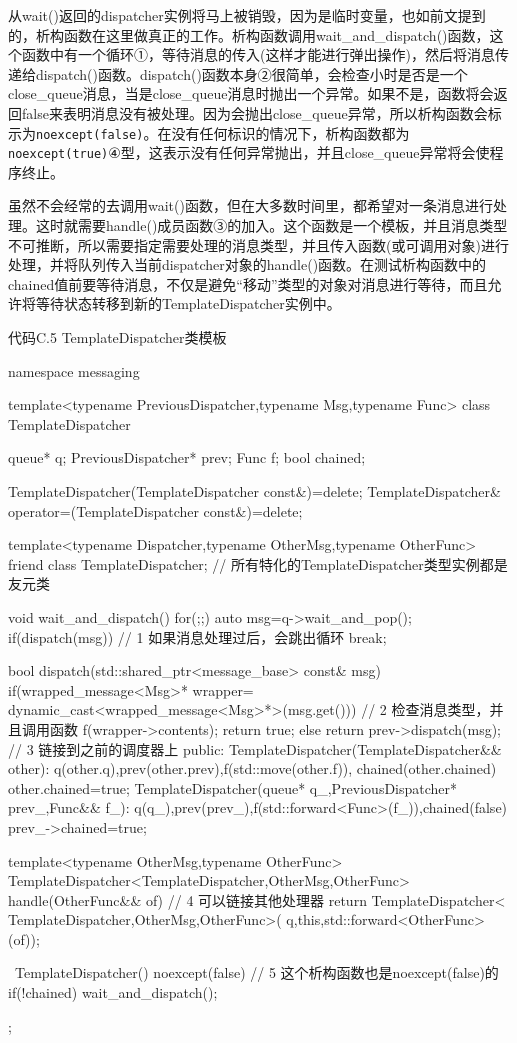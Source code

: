 从wait()返回的dispatcher实例将马上被销毁，因为是临时变量，也如前文提到的，析构函数在这里做真正的工作。析构函数调用wait\_and\_dispatch()函数，这个函数中有一个循环①，等待消息的传入(这样才能进行弹出操作)，然后将消息传递给dispatch()函数。dispatch()函数本身②很简单，会检查小时是否是一个close\_queue消息，当是close\_queue消息时抛出一个异常。如果不是，函数将会返回false来表明消息没有被处理。因为会抛出close\_queue异常，所以析构函数会标示为\texttt{noexcept(false)}。在没有任何标识的情况下，析构函数都为\texttt{noexcept(true)}④型，这表示没有任何异常抛出，并且close\_queue异常将会使程序终止。

虽然不会经常的去调用wait()函数，但在大多数时间里，都希望对一条消息进行处理。这时就需要handle()成员函数③的加入。这个函数是一个模板，并且消息类型不可推断，所以需要指定需要处理的消息类型，并且传入函数(或可调用对象)进行处理，并将队列传入当前dispatcher对象的handle()函数。在测试析构函数中的chained值前要等待消息，不仅是避免“移动”类型的对象对消息进行等待，而且允许将等待状态转移到新的TemplateDispatcher实例中。

代码C.5 TemplateDispatcher类模板

\begin{cpp}
namespace messaging
{
  template<typename PreviousDispatcher,typename Msg,typename Func>
  class TemplateDispatcher
  {
    queue* q;
    PreviousDispatcher* prev;
    Func f;
    bool chained;

    TemplateDispatcher(TemplateDispatcher const&)=delete;
    TemplateDispatcher& operator=(TemplateDispatcher const&)=delete;

    template<typename Dispatcher,typename OtherMsg,typename OtherFunc>
    friend class TemplateDispatcher;  // 所有特化的TemplateDispatcher类型实例都是友元类

    void wait_and_dispatch()
    {
      for(;;)
      {
        auto msg=q->wait_and_pop();
        if(dispatch(msg))  // 1 如果消息处理过后，会跳出循环
          break;
      }
    }

    bool dispatch(std::shared_ptr<message_base> const& msg)
    {
      if(wrapped_message<Msg>* wrapper=
         dynamic_cast<wrapped_message<Msg>*>(msg.get()))  // 2 检查消息类型，并且调用函数
      {
        f(wrapper->contents);
        return true;
      }
      else
      {
        return prev->dispatch(msg);  // 3 链接到之前的调度器上
      }
    }
  public:
    TemplateDispatcher(TemplateDispatcher&& other):
        q(other.q),prev(other.prev),f(std::move(other.f)),
        chained(other.chained)
    {
      other.chained=true;
    }
    TemplateDispatcher(queue* q_,PreviousDispatcher* prev_,Func&& f_):
        q(q_),prev(prev_),f(std::forward<Func>(f_)),chained(false)
    {
      prev_->chained=true;
    }

    template<typename OtherMsg,typename OtherFunc>
    TemplateDispatcher<TemplateDispatcher,OtherMsg,OtherFunc>
    handle(OtherFunc&& of)  // 4 可以链接其他处理器
    {
      return TemplateDispatcher<
          TemplateDispatcher,OtherMsg,OtherFunc>(
          q,this,std::forward<OtherFunc>(of));
    }

    ~TemplateDispatcher() noexcept(false)  // 5 这个析构函数也是noexcept(false)的
    {
      if(!chained)
      {
        wait_and_dispatch();
      }
    }
  };
}
\end{cpp}

